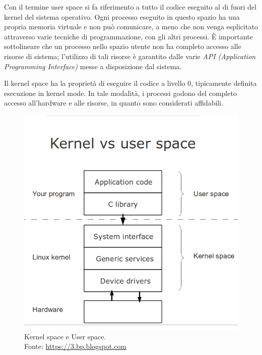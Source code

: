 Con il termine user space si fa riferimento a tutto il codice eseguito al di fuori del kernel del sistema operativo. Ogni processo eseguito in questo spazio ha una propria memoria virtuale e non può comunicare, a meno che non venga esplicitato attraverso varie tecniche di programmazione, con gli altri processi. È importante sottolineare che un processo nello spazio utente non ha completo accesso alle risorse di sistema; l'utilizzo di tali risorse è garantito dalle varie \emph{API (Application Programming Interface)} messe a disposizione dal sistema.

Il kernel space ha la proprietà di eseguire il codice a livello 0, tipicamente definita esecuzione in kernel mode. In tale modalità, i processi godono del completo accesso all'hardware e alle risorse, in quanto sono considerati affidabili.

\begin{figure}[!ht]
\centering
\includegraphics[scale=0.3]{Figures/Spaces}
\caption[Kernel space e User space]{Kernel space e User space.\\ Fonte: \href{https://3.bp.blogspot.com/-s-8vrCL_OPg/V33EJafdJTI/AAAAAAAAPcY/rKlsSv2ay-IYRHLoZdKS07YIgPVS9JX9QCLcB/s1600/Screenshot+from+2016-07-07_08-18-32.png}{https://3.bp.blogspot.com}}
\label{fig:KUSpace}
\end{figure}

